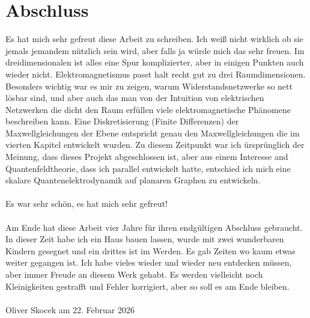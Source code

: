 \documentclass[11pt,a4paper,leqno]{report}
\numberwithin{equation}{chapter}
\begin{document}
\chapter*{Abschluss}
Es hat mich sehr gefreut diese Arbeit zu schreiben. Ich wei\ss{} nicht wirklich ob sie jemals jemandem n\"utzlich sein wird, aber falls ja w\"urde mich das sehr freuen. Im dreidimensionalen ist alles eine Spur komplizierter, aber in einigen Punkten auch wieder nicht. Elektromagnetismus passt halt recht gut zu drei Raumdimensionen. Besonders wichtig war es mir zu zeigen, warum Widerstandsnetzwerke so nett l\"osbar sind, und aber auch das man von der Intuition von elektrischen Netzwerken die dicht den Raum erf\"ullen viele elektromagnetische Ph\"anomene beschreiben kann. Eine Diskretisierung (Finite Differenzen) der Maxwellgleichungen der Ebene entspricht genau den Maxwellgleichungen die im vierten Kapitel entwickelt wurden. Zu diesem Zeitpunkt war ich \"urspr\"unglich der Meinung, dass dieses Projekt abgeschlossen ist, aber aus einem Interesse and Quantenfeldtheorie, dass ich parallel entwickelt hatte, entschied ich mich eine skalare Quantenelektrodynamik auf planaren Graphen zu entwickeln.\\
\\
Es war sehr sch\"on, es hat mich sehr gefreut!
\\
\\
Am Ende hat diese Arbeit vier Jahre für ihren endgültigen Abschluss gebraucht. In dieser Zeit habe ich ein Haus bauen lassen, wurde mit zwei wunderbaren Kindern gesegnet und ein drittes ist im Werden. Es gab Zeiten wo kaum etwas weiter gegangen ist. Ich habe vieles wieder und wieder neu entdecken müssen, aber immer Freude an diesem Werk gehabt. Es werden vielleicht noch Kleinigkeiten gestrafft und Fehler korrigiert, aber so soll es am Ende bleiben. \\
\\
Oliver Skocek am 22. Februar 2026
\end{document}
